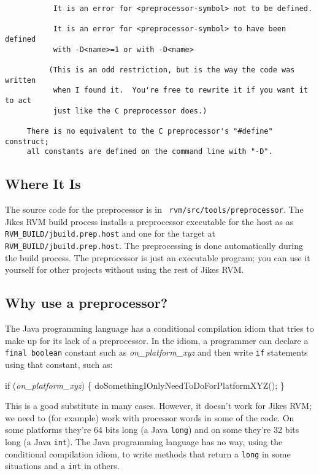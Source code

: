 \begin{verbatim}
           It is an error for <preprocessor-symbol> not to be defined.

           It is an error for <preprocessor-symbol> to have been defined
           with -D<name>=1 or with -D<name>

          (This is an odd restriction, but is the way the code was written
           when I found it.  You're free to rewrite it if you want it to act
           just like the C preprocessor does.)

     There is no equivalent to the C preprocessor's "#define" construct;
     all constants are defined on the command line with "-D".
\end{verbatim}

\subsection{Where It Is}

The source code for the preprocessor is in {\tt
  rvm/src/tools/preprocessor}.  The Jikes RVM build process installs a
preprocessor executable for the host as as {\tt
  RVM\_BUILD/jbuild.prep.host} and one for the target at {\tt
  RVM\_BUILD/jbuild.prep.host}.  The preprocessing is done
automatically during the build process.  The preprocessor is just an
executable program; you can use it yourself for other projects without
using the rest of Jikes RVM.\@


\subsection{Why use a preprocessor?}

The Java programming language has a conditional compilation idiom that tries to make up for its
lack of a preprocessor.  In the idiom, a programmer can
declare a {\tt final boolean} constant such as {\it on\_platform\_xyz}
and then write {\tt if} statements using that constant, such as:
\begin{example}
if ({\it on\_platform\_xyz}) \{
   doSomethingIOnlyNeedToDoForPlatformXYZ();
\}    
\end{example}

This is a good substitute in many cases.  However, it doesn't work for
Jikes RVM; we need to (for example) work with processor words in some of
the code.  On some platforms they're 64 bits long (a Java {\tt long})
and on some they're 32 bits long (a Java {\tt int}).  The Java
programming language has no way,
using the conditional compilation idiom, to write methods that return
a {\tt long} in some situations and a {\tt int} in others.

